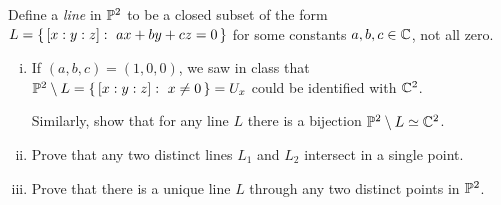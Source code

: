 \documentclass[12pt]{memoir}
\begin{document}
\begin{Ej}
 Define a \emph{line} in $\mathbb{P}^2$ to be a closed subset of the form $L=\{\,[x:y:z]:\ ax+by+cz=0\,\}$ for some constants $a,b,c\in\mathbb{C}$, not all zero.
 \begin{enumerate}[i)]
  \itemsep=-0.4em
  \item If $(a,b,c)=(1,0,0)$, we saw in class that $\mathbb{P}^2\setminus L=\{\,[x:y:z]:\ x\neq 0\,\}=U_x$ could be identified with $\mathbb{C}^2$.\par 
  Similarly, show that for any line $L$ there is a bijection $\mathbb{P}^2\setminus L\simeq \mathbb{C}^2$.
  \item Prove that any two distinct lines $L_1$ and $L_2$ intersect in a single point.
  \item Prove that there is a unique line $L$ through any two distinct points in $\mathbb{P}^2$.
 \end{enumerate}
\end{Ej}

\begin{ptcbr}
  \end{ptcbr}

  
\end{document}
